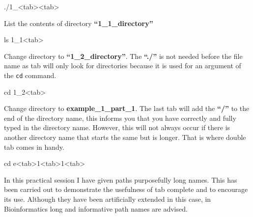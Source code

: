 \documentclass[
  letterpaper,
  DIV=11,
  numbers=noendperiod]{scrreprt}
\newenvironment{Shaded}{\begin{snugshade}}{\end{snugshade}}
\newcommand{\BuiltInTok}[1]{\textcolor[rgb]{0.00,0.23,0.31}{#1}}
\newcommand{\ExtensionTok}[1]{\textcolor[rgb]{0.00,0.23,0.31}{#1}}
\newcommand{\FunctionTok}[1]{\textcolor[rgb]{0.28,0.35,0.67}{#1}}
\newcommand{\NormalTok}[1]{\textcolor[rgb]{0.00,0.23,0.31}{#1}}
\newcommand{\OperatorTok}[1]{\textcolor[rgb]{0.37,0.37,0.37}{#1}}
\begin{document}
\begin{Shaded}
\begin{Highlighting}[]
\ExtensionTok{./1\_}\OperatorTok{\textless{}}\NormalTok{tab}\OperatorTok{\textgreater{}\textless{}}\NormalTok{tab}\OperatorTok{\textgreater{}}
\end{Highlighting}
\end{Shaded}

List the contents of directory \textbf{``1\_1\_directory''}

\begin{Shaded}
\begin{Highlighting}[]
\FunctionTok{ls}\NormalTok{ 1\_1}\OperatorTok{\textless{}}\NormalTok{tab}\OperatorTok{\textgreater{}}
\end{Highlighting}
\end{Shaded}

Change directory to \textbf{``1\_2\_directory''}. The \textbf{``./''} is
not needed before the file name as tab will only look for directories
because it is used for an argument of the \texttt{cd} command.

\begin{Shaded}
\begin{Highlighting}[]
\BuiltInTok{cd}\NormalTok{ 1\_2}\OperatorTok{\textless{}}\NormalTok{tab}\OperatorTok{\textgreater{}}
\end{Highlighting}
\end{Shaded}

Change directory to \textbf{example\_1\_part\_1}. The last tab will add
the \textbf{``/''} to the end of the directory name, this informs you
that you have correctly and fully typed in the directory name. However,
this will not always occur if there is another directory name that
starts the same but is longer. That is where double tab comes in handy.

\begin{Shaded}
\begin{Highlighting}[]
\BuiltInTok{cd}\NormalTok{ e}\OperatorTok{\textless{}}\NormalTok{tab}\OperatorTok{\textgreater{}}\NormalTok{1}\OperatorTok{\textless{}}\NormalTok{tab}\OperatorTok{\textgreater{}}\NormalTok{1}\OperatorTok{\textless{}}\NormalTok{tab}\OperatorTok{\textgreater{}}
\end{Highlighting}
\end{Shaded}

In this practical session I have given paths purposefully long names.
This has been carried out to demonstrate the usefulness of tab complete
and to encourage its use. Although they have been artificially extended
in this case, in Bioinformatics long and informative path names are
advised.
\end{document}
